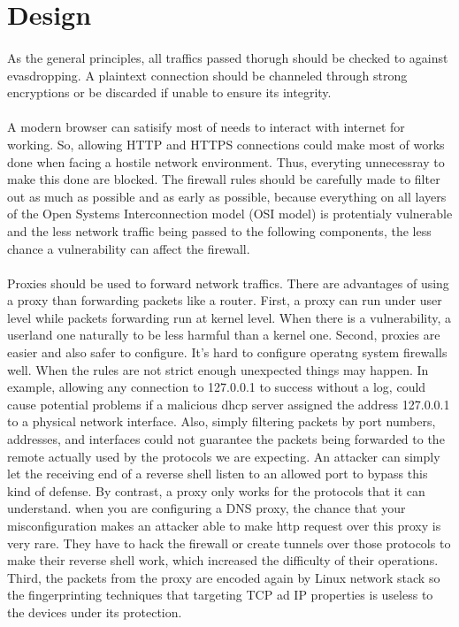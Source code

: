 \documentclass[mscthesis]{usiinfthesis}
\begin{document}
\section{Design}
\paragraph{}
As the general principles, all traffics passed thorugh should be checked to against evasdropping. A plaintext connection should be channeled through strong encryptions or be discarded if unable to ensure its integrity.
\paragraph{}
A modern browser can satisify most of needs to interact with internet for working. So, allowing HTTP and HTTPS connections could make most of works done when facing a hostile network environment. Thus, everyting unnecessray to make this done are blocked. The firewall rules should be carefully made to filter out as much as possible and as early as possible, because everything on all layers of the Open Systems Interconnection model (OSI model) is protentialy vulnerable and the less network traffic being passed to the following components, the less chance a vulnerability can affect the firewall.
\paragraph{}
Proxies should be used to forward network traffics. There are advantages of using a proxy than forwarding packets like a router. First, a proxy can run under user level while packets forwarding run at kernel level. When there is a vulnerability, a userland one naturally to be less harmful than a kernel one. Second, proxies are easier and also safer to configure. It's hard to configure operatng system firewalls well. When the rules are not strict enough unexpected things may happen. In example, allowing any connection to 127.0.0.1 to success without a log, could cause potential problems if a malicious dhcp server assigned the address 127.0.0.1 to a physical network interface. Also, simply filtering packets by port numbers, addresses, and interfaces could not guarantee the packets being forwarded to the remote actually used by the protocols we are expecting. An attacker can simply let the receiving end of a reverse shell listen to an allowed port to bypass this kind of defense. By contrast, a proxy only works for the protocols that it can understand. when you are configuring a DNS proxy, the chance that your misconfiguration makes an attacker able to make http request over this proxy is very rare. They have to hack the firewall or create tunnels over those protocols to make their reverse shell work, which increased the difficulty of their operations. Third, the packets from the proxy are encoded again by Linux network stack so the fingerprinting techniques that targeting TCP ad IP properties is useless to the devices under its protection.
\end{document}
